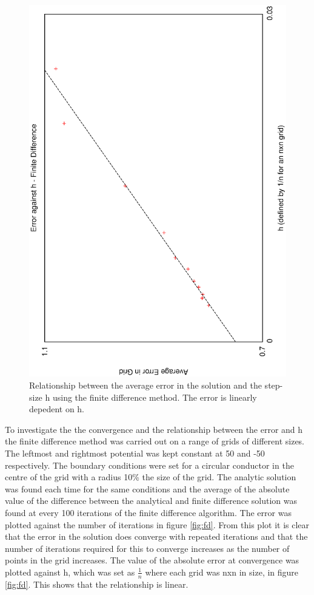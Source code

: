 \documentclass[aps,twocolumn,pre,nofootinbib,10pt]{revtex4-1}
\begin{document}
\begin{figure}
\includegraphics[height=\breite \columnwidth,angle=-90]{fd_h.eps}

\caption{Relationship between the average error in the solution and the step-size h using the finite difference method. The error is linearly depedent on h.}
\label{fig:fd_lin}
\end{figure}

To investigate the the convergence and the relationship between the error and h the finite difference method was carried out on a range of grids of different sizes. The leftmost and rightmost potential was kept constant at 50 and -50 respectively. The boundary conditions were set for a circular conductor in the centre of the grid with a radius 10\% the size of the grid. The analytic solution was found each time for the same conditions and the average of the absolute value of the difference between the analytical and finite difference solution was found at every 100 iterations of the finite difference algorithm. The error was plotted against the number of iterations in figure \ref{fig:fd}. From this plot it is clear that the error in the solution does converge with repeated iterations and that the number of iterations required for this to converge increases as the number of points in the grid increases. 
The value of the absolute error at convergence was plotted against h, which was set as \(\frac{1}{n}\) where each grid was nxn in size, in figure \ref{fig:fd}. This shows that the relationship is linear.
\end{document}

